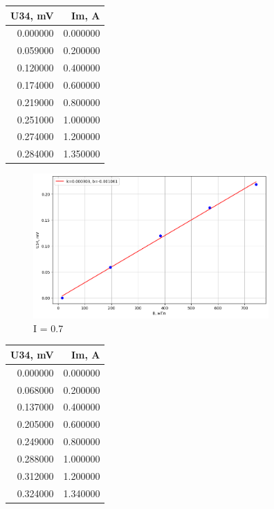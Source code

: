 \documentclass[a4paper, 12pt]{article}
\begin{document}
                \begin{table}[h!]
                    \centering
\begin{tabular}{rr}
\toprule
U34, mV & Im, A \\
\midrule
0.000000 & 0.000000 \\
0.059000 & 0.200000 \\
0.120000 & 0.400000 \\
0.174000 & 0.600000 \\
0.219000 & 0.800000 \\
0.251000 & 1.000000 \\
0.274000 & 1.200000 \\
0.284000 & 1.350000 \\
\bottomrule
\end{tabular}
\end{table}

\begin{figure}[h!]
    \centering
    \includegraphics[width=90mm]{./images/image copy 4.png}
    \caption{I = 0.7}
\end{figure}
\newpage
\begin{table}[h!]
    \centering
\begin{tabular}{rr}
    \toprule
    U34, mV & Im, A \\
    \midrule
    0.000000 & 0.000000 \\
    0.068000 & 0.200000 \\
    0.137000 & 0.400000 \\
    0.205000 & 0.600000 \\
    0.249000 & 0.800000 \\
    0.288000 & 1.000000 \\
    0.312000 & 1.200000 \\
    0.324000 & 1.340000 \\
    \bottomrule
    \end{tabular}
\end{table}
\end{document}
